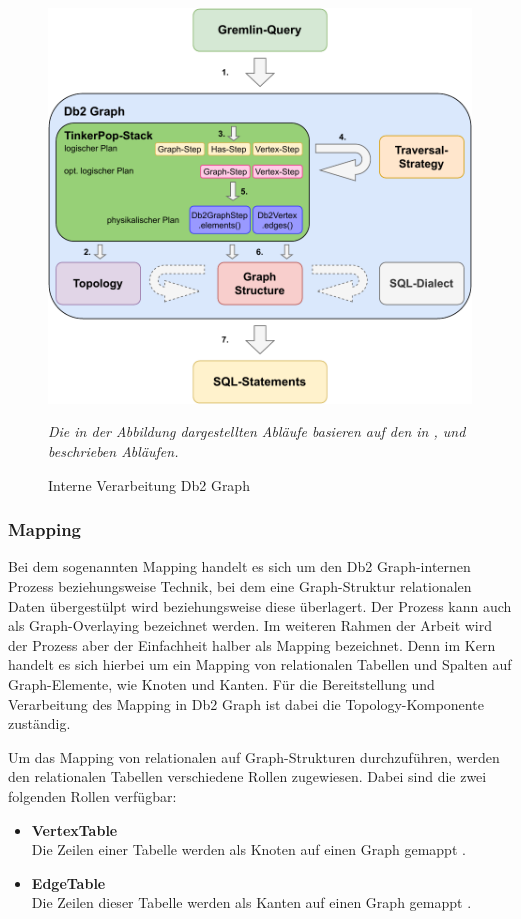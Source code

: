 \begin{figure}[h]
    \centering
    \includegraphics[width=\textwidth]{images/db2graph_intern_processing.pdf}
    \caption{Interne Verarbeitung Db2 Graph}
    \label{fig:db2graph_intern_processing}
    \vspace{1em}
    \textit{Die in der Abbildung dargestellten Abläufe basieren auf den in \cite{yt_tian}, \cite{vldb_tian} und \cite{sigmod_tian} beschrieben Abläufen.} 
\end{figure}

\subsubsection{Mapping}
Bei dem sogenannten Mapping handelt es sich um den Db2 Graph-internen Prozess beziehungsweise Technik, bei dem eine Graph-Struktur relationalen Daten überge\-stülpt wird beziehungsweise diese überlagert. Der Prozess kann auch als Graph-Overlaying bezeichnet werden. Im weiteren Rahmen der Arbeit wird der Prozess aber der Einfachheit halber als Mapping bezeichnet. Denn im Kern handelt es sich hierbei um ein Mapping von relationalen Tabellen und Spalten auf Graph-Elemente, wie Knoten und Kanten. Für die Bereitstellung und Verarbeitung des Mapping in Db2 Graph ist dabei die Topology-Komponente zuständig. 

Um das Mapping von relationalen auf Graph-Strukturen durchzuführen, werden den relationalen Tabellen verschiedene Rollen zugewiesen. Dabei sind die zwei folgenden Rollen verfügbar:
\begin{itemize}
    \item \textbf{VertexTable}\\Die Zeilen einer Tabelle werden als Knoten auf einen Graph gemappt \cite{sigmod_tian, yt_tian}.
    \item \textbf{EdgeTable}\\Die Zeilen dieser Tabelle werden als Kanten auf einen Graph gemappt \cite{sigmod_tian, yt_tian}.
\end{itemize}


